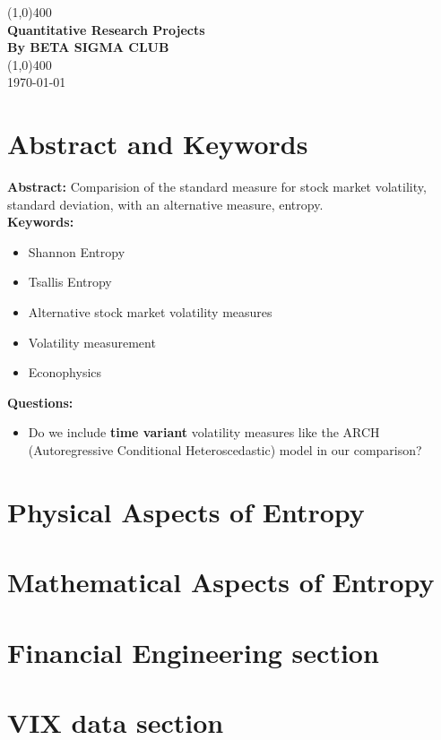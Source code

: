 \documentclass[11pt]{article}
\begin{document}
\begin{titlepage}
\begin{center}
\vspace*{1cm}
\vfill
\line(1,0){400}\\[1mm]
\huge{\textbf{Quantitative Research Projects}}\\[3mm]
\Large{\textbf{By BETA SIGMA CLUB}}\\[1mm]
\line(1,0){400}\\[3mm]
\vfill
\today

\end{center}
\end{titlepage}

\section{Abstract and Keywords}
\textbf{Abstract:} Comparision of the standard measure for stock market volatility, standard deviation, with an alternative measure, entropy. \\

\noindent \textbf{Keywords:}
\begin{itemize}
\item Shannon Entropy
\item Tsallis Entropy
\item Alternative stock market volatility measures
\item Volatility measurement
\item Econophysics
\end{itemize}

\noindent \textbf{Questions:}
\begin{itemize}
\item Do we include \textbf{time variant} volatility measures like the ARCH (Autoregressive Conditional Heteroscedastic) model in our comparison?
\end{itemize}

\section{Physical Aspects of Entropy}
\section{Mathematical Aspects of Entropy}
\section{Financial Engineering section}
\section{VIX data section}
\end{document}
